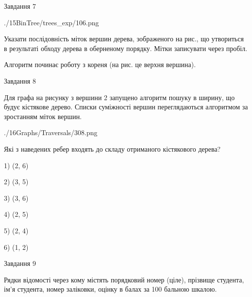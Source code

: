 \documentclass[12pt, ukrainian]{article}
\begin{document}
{\vspace{10mm}\par

\newpage
\begin{minipage}[t]{9.7cm}
               
{\begin{center}Завдання {7}\end{center}}
\vspace{-6mm}

\begin{center}
	{./15BinTree/trees_exp/106.png}
\end{center}
Указати послідовність міток вершин дерева, зображеного на рис., що утвориться в результаті обходу дерева в оберненому порядку. Мітки записувати через пробіл.\par Алгоритм починає роботу з кореня (на рис. це верхня вершина).\par

\end{minipage}
\vline \hspace{8mm}
\begin{minipage}[t]{8.0cm}
               
{\begin{center}Завдання {8}\end{center}}
\vspace{-6mm}
Для графа на рисунку з вершини 2 запущено алгоритм пошуку в ширину, що будує кістякове дерево. Списки суміжності вершин переглядаються алгоритмом за зростанням міток вершин.\par
\begin{center}
	{./16Graphs/Traversals/308.png}
\end{center}
\par Які з наведених ребер входять до складу отриманого кістякового дерева?\par
1) (2, 6)\par
2) (3, 5)\par
3) (3, 6)\par
4) (2, 5)\par
5) (2, 4)\par
6) (1, 2)\par
{\vskip 15pt} \par

\end{minipage}

               
{\begin{center}Завдання {9}\end{center}}
\vspace{-6mm}
Рядки відомості через кому містять порядковий номер (ціле), пріз\-ви\-ще студен\-та, ім'я студента, номер заліковки, оцінку в балах за 100 бальною шкалою.

}
\end{document}
